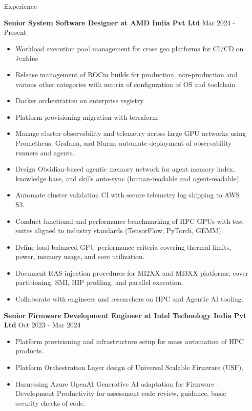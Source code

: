 \documentclass{resume} %
\begin{document}


\begin{rSection}{Experience}

{\bf Senior System Software Designer at AMD India Pvt Ltd} \hfill {Mar 2024 - Present }
\begin{itemize}
\if{}
    \item Workload execution pool management for cross geo platforms for CI/CD on Jenkins
    \item Release management of ROCm builds for production, non-production and various other categories with matrix of configuration of OS and toolchain
    \item Docker orchestration on enterprise registry
    \item Platform provisioning migration with terraform
\fi
    \item Manage cluster observability and telemetry across large GPU networks using Prometheus, Grafana, and Slurm; automate deployment of observability runners and agents.
    \item Design Obsidian-based agentic memory network for agent memory index, knowledge base, and skills auto-sync (human-readable and agent-readable).
    \item Automate cluster validation CI with secure telemetry log shipping to AWS S3.
    \item Conduct functional and performance benchmarking of HPC GPUs with test suites aligned to industry standards (TensorFlow, PyTorch, GEMM).
    \item Define load-balanced GPU performance criteria covering thermal limits, power, memory usage, and core utilization.
    \item Document RAS injection procedures for MI2XX and MI3XX platforms; cover partitioning, SMI, HIP profiling, and parallel execution.
\if{}
    \item Collaborate with engineers and researchers on HPC and Agentic AI tooling.
\fi
\end{itemize}

{\textbf{Senior Firmware Development Engineer at Intel Technology India Pvt Ltd}}  \hfill {Oct 2023 - Mar 2024}
\begin{itemize}
    \item Platform provisioning and infrastructure setup for mass automation of HPC products.
    \item Platform Orchestration Layer design of Universal Scalable Firmware (USF).
    \item Harnessing Azure OpenAI Generative AI adaptation for Firmware Development Productivity for assessment code review, guidance, basic security checks of code.


\end{itemize}
\end{rSection}
\end{document}
